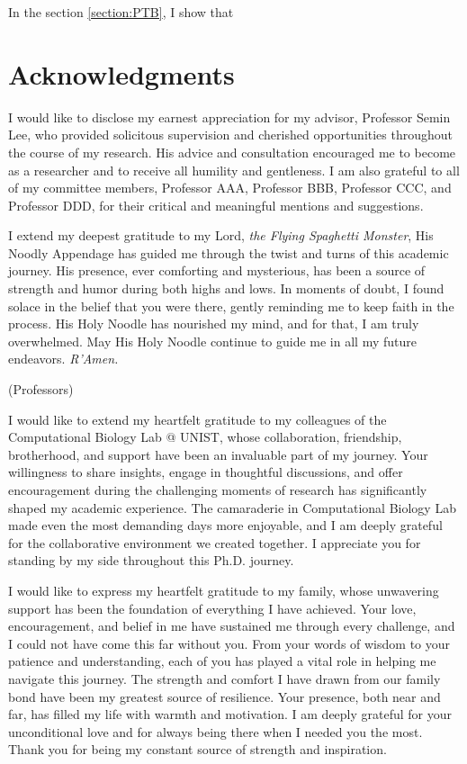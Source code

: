 \documentclass[11pt, a4paper, onecolumn, oneside]{report}
\begin{document}
        In the section \ref{section:PTB}, I show that
        \newpage

    
    
    \clearpage

    \section*{\hfill \Large Acknowledgments \hfill}
        I would like to disclose my earnest appreciation for my advisor, Professor Semin Lee, who provided solicitous supervision and cherished opportunities throughout the course of my research. His advice and consultation encouraged me to become as a researcher and to receive all humility and gentleness. I am also grateful to all of my committee members, Professor AAA, Professor BBB, Professor CCC, and Professor DDD, for their critical and meaningful mentions and suggestions.

        I extend my deepest gratitude to my Lord, \textit{the Flying Spaghetti Monster}, His Noodly Appendage has guided me through the twist and turns of this academic journey. His presence, ever comforting and mysterious, has been a source of strength and humor during both highs and lows. In moments of doubt, I found solace in the belief that you were there, gently reminding me to keep faith in the process. His Holy Noodle has nourished my mind, and for that, I am truly overwhelmed. May His Holy Noodle continue to guide me in all my future endeavors. \textit{R'Amen.}

        (Professors)

        I would like to extend my heartfelt gratitude to my colleagues of the Computational Biology Lab @ UNIST, whose collaboration, friendship, brotherhood, and support have been an invaluable part of my journey. Your willingness to share insights, engage in thoughtful discussions, and offer encouragement during the challenging moments of research has significantly shaped my academic experience. The camaraderie in Computational Biology Lab made even the most demanding days more enjoyable, and I am deeply grateful for the collaborative environment we created together. I appreciate you for standing by my side throughout this Ph.D. journey.

        I would like to express my heartfelt gratitude to my family, whose unwavering support has been the foundation of everything I have achieved. Your love, encouragement, and belief in me have sustained me through every challenge, and I could not have come this far without you. From your words of wisdom to your patience and understanding, each of you has played a vital role in helping me navigate this journey. The strength and comfort I have drawn from our family bond have been my greatest source of resilience. Your presence, both near and far, has filled my life with warmth and motivation. I am deeply grateful for your unconditional love and for always being there when I needed you the most. Thank you for being my constant source of strength and inspiration.
\end{document}
